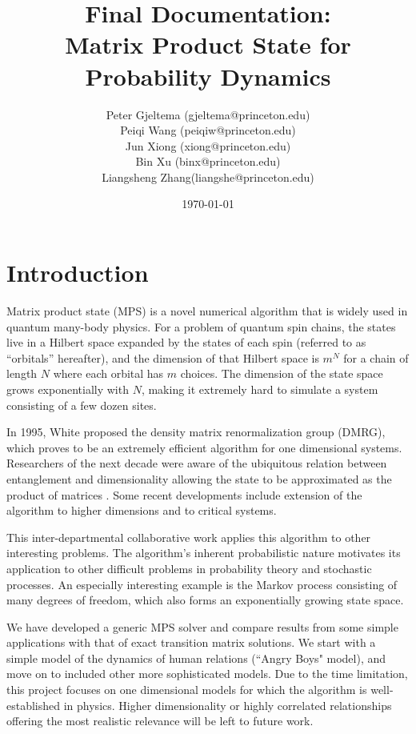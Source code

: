 \documentclass[english]{article}
\begin{document}
\title{Final Documentation: \\Matrix Product State for Probability Dynamics}


\author{Peter Gjeltema (gjeltema@princeton.edu)
	   \\ Peiqi Wang (peiqiw@princeton.edu)
	    \\ Jun Xiong (xiong@princeton.edu) 
	    \\ Bin Xu (binx@princeton.edu) 
	    \\ Liangsheng Zhang(liangshe@princeton.edu)}
	    
\date{\today}

\maketitle

\section{Introduction}

Matrix product state (MPS) is a novel numerical algorithm that is
widely used in quantum many-body physics. For a problem of quantum
spin chains, the states live in a Hilbert space expanded by the states
of each spin (referred to as ``orbitals'' hereafter), and the dimension
of that Hilbert space is $m^{N}$ for a chain of length $N$ where each orbital has $m$ choices. 
The dimension of the state space
grows exponentially with $N$, making it extremely hard to simulate
a system consisting of a few dozen sites. 

In 1995, White \cite{white} proposed
the density matrix renormalization group (DMRG), which proves to be an extremely efficient algorithm for one dimensional systems. Researchers of the next decade were aware of the ubiquitous relation between entanglement and dimensionality allowing the state to be approximated as the product of matrices \cite{schollwock}. Some recent developments include extension of the algorithm to higher dimensions\cite{cirac} and to critical systems\cite{vidal}.

This inter-departmental collaborative work applies this algorithm to other interesting problems. The algorithm's inherent probabilistic nature motivates its application to other difficult problems in probability theory and stochastic processes. An especially interesting example is the Markov process consisting of many degrees of freedom, which also forms an exponentially growing state space. 

We have developed  a generic MPS solver and compare results from some simple applications with that of exact transition matrix solutions. We start with a simple model of the dynamics of human relations (``Angry Boys" model), and move on to included other more sophisticated models. Due to the time limitation, this project focuses on one dimensional models for which the algorithm is well-established in physics. Higher dimensionality or highly correlated relationships offering the most realistic relevance will be left to future work.
\end{document}
